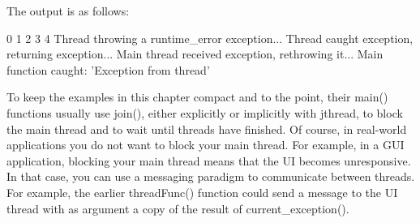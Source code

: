 The output is as follows:

\begin{shell}
0
1
2
3
4
Thread throwing a runtime_error exception...
Thread caught exception, returning exception...
Main thread received exception, rethrowing it...
Main function caught: 'Exception from thread'
\end{shell}

To keep the examples in this chapter compact and to the point, their main() functions usually use join(), either explicitly or implicitly with jthread, to block the main thread and to wait until threads have finished. Of course, in real-world applications you do not want to block your main thread. For example, in a GUI application, blocking your main thread means that the UI becomes unresponsive. In that case, you can use a messaging paradigm to communicate between threads. For example, the earlier threadFunc() function could send a message to the UI thread with as argument a copy of the result of current\_exception().



